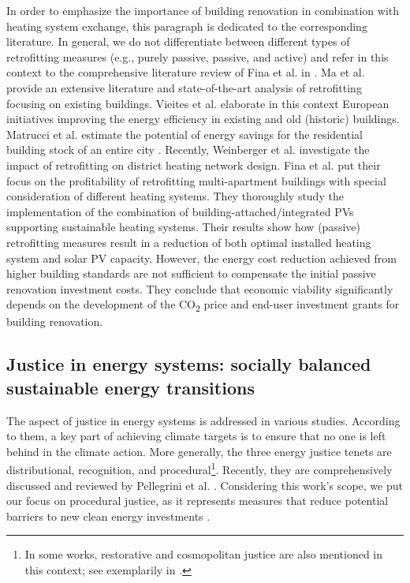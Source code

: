 In order to emphasize the importance of building renovation in combination with heating system exchange, this paragraph is dedicated to the corresponding literature. In general, we do not differentiate between different types of retrofitting measures (e.g., purely passive, passive, and active) and refer in this context to the comprehensive literature review of Fina et al. in \cite{fina2019profitability}. Ma et al. \cite{ma2012existing} provide an extensive literature and state-of-the-art analysis of retrofitting focusing on existing buildings. Vieites et al. \cite{vieites2015european} elaborate in this context European initiatives improving  the energy efficiency in existing and old (historic) buildings. Matrucci et al. estimate the potential of energy savings for the residential building stock of an entire city \cite{mastrucci2014estimating}. Recently, Weinberger et al. \cite{weinberger2021investigating} investigate the impact of retrofitting on district heating network design. Fina et al. \cite{fina2019profitability} put their focus on the profitability of retrofitting multi-apartment buildings with special consideration of different heating systems. They thoroughly study the implementation of the combination of building-attached/integrated PVs supporting sustainable heating systems. Their results show how (passive) retrofitting measures result in a reduction of both optimal installed heating system and solar PV capacity. However, the energy cost reduction achieved from higher building standards are not sufficient to compensate the initial passive renovation investment costs. They conclude that economic viability significantly depends on the development of the CO\textsubscript{2} price and end-user investment grants for building renovation.

\subsection{Justice in energy systems: socially balanced sustainable energy transitions}\label{aspect2}
The aspect of justice in energy systems is addressed in various studies. According to them, a key part of achieving climate targets is to ensure that no one is left behind in the climate action. More generally, the three energy justice tenets are distributional, recognition, and procedural\footnote{In some works, restorative and cosmopolitan justice are also mentioned in this context; see exemplarily in \cite{oxfordjustice2021}.}. Recently, they are comprehensively discussed and reviewed by Pellegrini et al. \cite{pellegrini2020energy}. Considering this work's scope, we put our focus on procedural justice, as it represents measures that reduce potential barriers to new clean energy investments \cite{oxfordjustice2021}.\vspace{0.5cm}

